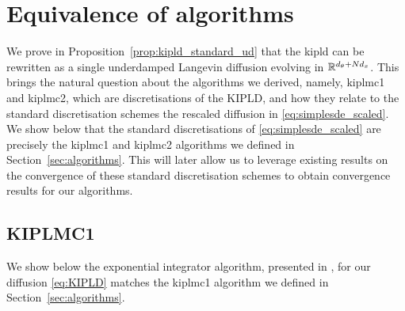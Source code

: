 \section{Equivalence of algorithms}\label{app:algderiv}
We prove in Proposition~\ref{prop:kipld_standard_ud} that the \gls*{kipld} can be rewritten as a single underdamped Langevin diffusion evolving in ${\mathbb R}^{d_\theta + N d_x}$. This brings the natural question about the algorithms we derived, namely, \gls*{kiplmc1} and \gls*{kiplmc2}, which are discretisations of the KIPLD, and how they relate to the standard discretisation schemes the rescaled diffusion in \eqref{eq:simplesde_scaled}. We show below that the standard discretisations of \eqref{eq:simplesde_scaled} are precisely the \gls*{kiplmc1} and \gls*{kiplmc2} algorithms we defined in Section~\ref{sec:algorithms}. This will later allow us to leverage existing results on the convergence of these standard discretisation schemes to obtain convergence results for our algorithms.


\subsection{KIPLMC1}\label{app:algderivKIPLMC1}
We show below the exponential integrator algorithm, presented in \citep{dalalyan2018sampling}, for our diffusion \eqref{eq:KIPLD} matches the \gls*{kiplmc1} algorithm we defined in Section~\ref{sec:algorithms}.

